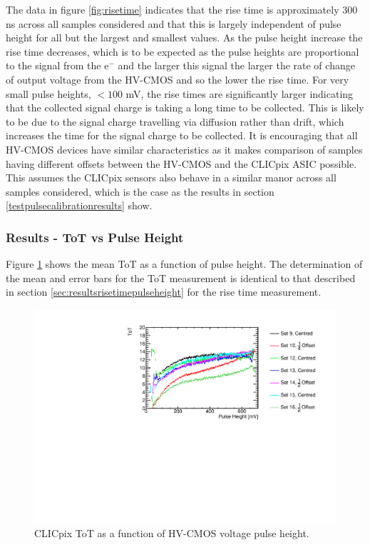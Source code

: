The data in figure \ref{fig:risetime} indicates that the rise time is approximately 300 ns across all samples considered and that this is largely independent of pulse height for all but the largest and smallest values.  As the pulse height increase the rise time decreases, which is to be expected as the pulse heights are proportional to the signal from the $\text{e}^{-}$ and the larger this signal the larger the rate of change of output voltage from the HV-CMOS and so the lower the rise time.  For very small pulse heights, $< 100$ mV, the rise times are significantly larger indicating that the collected signal charge is taking a long time to be collected.  This is likely to be due to the signal charge travelling via diffusion rather than drift, which increases the time for the signal charge to be collected.  It is encouraging that all HV-CMOS devices have similar characteristics as it makes comparison of samples having different offsets between the HV-CMOS and the CLICpix ASIC possible.  This assumes the CLICpix sensors also behave in a similar manor across all samples considered, which is the case as the results in section \ref{testpulsecalibrationresults} show.  


\subsubsection{Results -  ToT vs Pulse Height}
\label{sec:totvspulseheight}
Figure \ref{fig:tot} shows the mean ToT as a function of pulse height.  The determination of the mean and error bars for the ToT measurement is identical to that described in section \ref{sec:resultsrisetimepulseheight} for the rise time measurement. 

\begin{figure}
\centering
\includegraphics[width=1.0\textwidth]{CLICdpVertex/Plots/RadSourceAnalysis/AllSETs_TargetTot_PulseHeight.pdf}
\caption[CLICpix ToT as a function of HV-CMOS voltage pulse height.]{CLICpix ToT as a function of HV-CMOS voltage pulse height.}
\label{fig:tot}
\end{figure}

